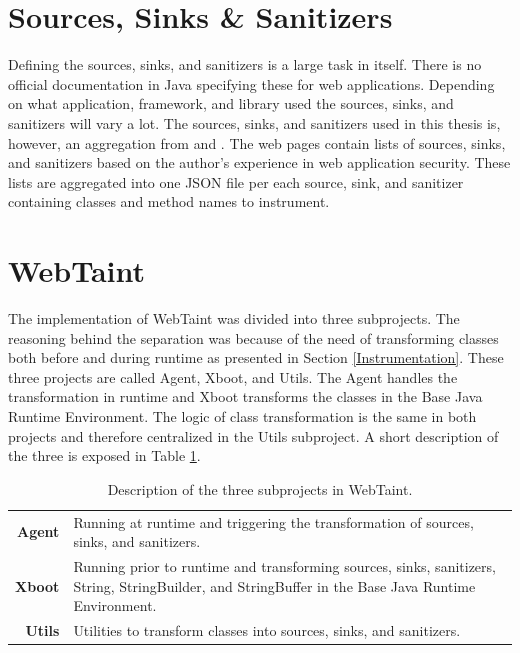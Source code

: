 \section{Sources, Sinks \& Sanitizers}
\label{souresSS}
Defining the sources, sinks, and sanitizers is a large task in itself. There is no official documentation in Java specifying these for web applications. Depending on what application, framework, and library used the sources, sinks, and sanitizers will vary a lot. The sources, sinks, and sanitizers used in this thesis is, however, an aggregation from \textcite{sssCodeMaster} and \textcite{sssOWASP}. The web pages contain lists of sources, sinks, and sanitizers based on the author's experience in web application security. These lists are aggregated into one JSON file per each source, sink, and sanitizer containing classes and method names to instrument.



\section{WebTaint}
\label{SoftwareArchitecture}
The implementation of WebTaint was divided into three subprojects. The reasoning behind the separation was because of the need of transforming classes both before and during runtime as presented in Section \ref{Instrumentation}. These three projects are called Agent, Xboot, and Utils. The Agent handles the transformation in runtime and Xboot transforms the classes in the Base Java Runtime Environment. The logic of class transformation is the same in both projects and therefore centralized in the Utils subproject. A short description of the three is exposed in Table \ref{table:subprojects}.

\begin{table}[H]
    \centering
    \caption{Description of the three subprojects in WebTaint.}
    \label{table:subprojects}
    \begin{tabular}{rp{10cm}}
        \textbf{Agent} & Running at runtime and triggering the transformation of sources, sinks, and sanitizers. \\
        \textbf{Xboot} & Running prior to runtime and transforming sources, sinks, sanitizers, String, StringBuilder, and StringBuffer in the Base Java Runtime Environment. \\
        \textbf{Utils} & Utilities to transform classes into sources, sinks, and sanitizers. \\
    \end{tabular}
\end{table}

